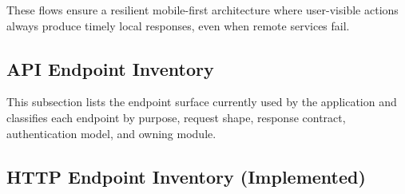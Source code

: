 \documentclass[conference]{IEEEtran}
\begin{document}
These flows ensure a resilient mobile-first architecture where user-visible actions always produce timely local responses, even when remote services fail.

\subsection{API Endpoint Inventory}

This subsection lists the endpoint surface currently used by the application and classifies each endpoint by purpose, request shape, response contract, authentication model, and owning module.

\subsection{HTTP Endpoint Inventory (Implemented)}
\end{document}
